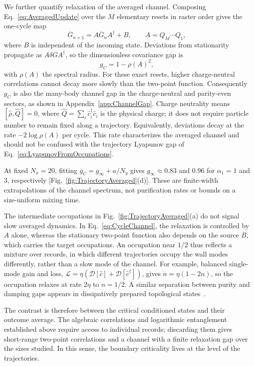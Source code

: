 \documentclass[aps,prb,10pt,twocolumn,superscriptaddress,longbibliography,floatfix]{revtex4-2}
\newcommand{\mc}[1]{\mathcal{#1}}
\newcommand{\newtext}[1]{{\color{blue}#1}}
\newcommand{\claudeadd}[1]{{\color{orange}#1}}
\begin{document}
{\color{blue}
We further quantify relaxation of the averaged channel. Composing Eq.~\eqref{eq:AveragedUpdate} over the $M$ elementary resets in raster order gives the one-cycle map
\begin{equation}
 \overline G_{n+1}=A\overline G_nA^\dagger+B,\qquad A=Q_M\cdots Q_1,
 \label{eq:CycleChannel}
\end{equation}
where $B$ is independent of the incoming state. Deviations from stationarity propagate as $A\delta G A^\dagger$, so the dimensionless covariance gap is
\begin{equation}
 g_C=1-\rho(A)^2,
 \label{eq:ChannelGap}
\end{equation}
with $\rho(A)$ the spectral radius. For these exact resets, higher charge-neutral correlations cannot decay more slowly than the two-point function. Consequently $g_C$ is also the many-body channel gap in the charge-neutral and parity-even sectors, as shown in Appendix~\ref{app:ChannelGap}. Charge neutrality means $[\hat\rho,\hat Q]=0$, where $\hat Q=\sum_i\hat c_i^\dagger\hat c_i$ is the physical charge; it does not require particle number to remain fixed along a trajectory. \claudeadd{Equivalently, deviations decay at the rate $-2\log\rho(A)$ per cycle. This rate characterizes the averaged channel and should not be confused with the trajectory Lyapunov gap of Eq.~\eqref{eq:LyapunovFromOccupations}.}

At fixed $N_x=20$, fitting $g_C=g_\infty+a/N_y$ gives $g_\infty\approx0.83$ and $0.96$ for $\alpha_1=1$ and $3$, respectively [Fig.~\ref{fig:TrajectoryAveraged}(d)]. These are finite-width extrapolations of the channel spectrum, not purification rates or bounds on a size-uniform mixing time.

\claudeadd{The intermediate occupations in Fig.~\ref{fig:TrajectoryAveraged}(a) do not signal slow averaged dynamics. In Eq.~\eqref{eq:CycleChannel}, the relaxation is controlled by $A$ alone, whereas the stationary two-point function also depends on the source $B$, which carries the target occupations. An occupation near $1/2$ thus reflects a mixture over records, in which different trajectories occupy the wall modes differently, rather than a slow mode of the channel. \newtext{For example, balanced single-mode gain and loss, $\mc L=\eta(\mc D[\hat c]+\mc D[\hat c^\dagger])$, gives $\dot n=\eta(1-2n)$, so the occupation relaxes at rate $2\eta$ to $n=1/2$.} A similar separation between purity and damping gaps appears in dissipatively prepared topological states~\cite{BardynEtAl2013}.}


The contrast is therefore between the critical conditioned states and their outcome average. The algebraic correlations and logarithmic entanglement established above require access to individual records; discarding them gives short-range two-point correlations and a channel with a finite relaxation gap over the sizes studied. In this sense, the boundary criticality lives at the level of the trajectories.   
}
\end{document}
